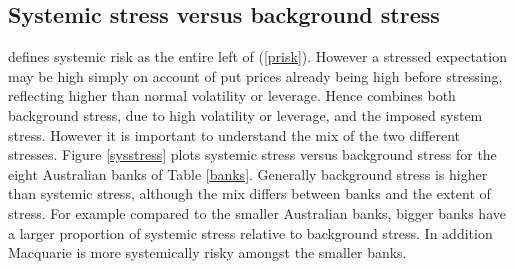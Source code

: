 \documentclass[authoryear]{elsarticle}
\newcommand{\E}{\mathrm{E}}
\newcommand{\Es}{\E_\phi}
\newcommand{\eref}[1]{(\ref{#1})}
\newcommand{\fref}[1]{Figure \ref{#1}}
\newcommand{\tref}[1]{Table \ref{#1}}
\begin{document}

\subsection{Systemic stress versus background stress}

\cite{brownlees2015} defines systemic risk as the entire left of \eref{prisk}. However a stressed expectation may be high simply on account of put prices already being high before stressing, reflecting higher than normal volatility or leverage. Hence \cite{brownlees2015} combines both background stress, due to high volatility or leverage, and the imposed system stress. However it is important to understand the mix of the two different stresses. \fref{sysstress} plots systemic stress versus background stress for the eight Australian banks of \tref{banks}.   Generally background stress is higher than systemic stress, although the mix differs between banks and the extent of stress. For example compared to the smaller Australian banks, bigger banks have a larger proportion of systemic stress relative to background stress. In addition Macquarie is more systemically risky amongst the smaller banks.

\end{document}

